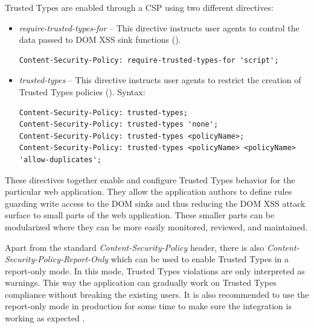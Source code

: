 Trusted Types are enabled through a CSP using two different directives:

\begin{itemize}
  \item \emph{require-trusted-types-for} -- This directive instructs user agents to control the
        data passed to DOM XSS sink functions (\cite{mdn:require-trusted-types-for}).

        \vspace{5mm}
        \bigskip
        \begin{lstlisting}[language={}, caption=Syntax of \emph{require-trusted-types-for directive}]
Content-Security-Policy: require-trusted-types-for 'script';\end{lstlisting}

  \item \emph{trusted-types} -- This directive instructs user agents to restrict the creation of
        Trusted Types policies (\cite{mdn:trusted-types}). Syntax:

        \bigskip
        \begin{lstlisting}[language={}, caption=Syntax of \emph{trusted-types directive}]
Content-Security-Policy: trusted-types;
Content-Security-Policy: trusted-types 'none';
Content-Security-Policy: trusted-types <policyName>;
Content-Security-Policy: trusted-types <policyName> <policyName> 'allow-duplicates';\end{lstlisting}
\end{itemize}

\vspace{5mm}

These directives together enable and configure Trusted Types behavior for the particular web
application. They allow the application authors to define rules guarding write access to the DOM
sinks and thus reducing the DOM XSS attack surface to small parts of the web application. These
smaller parts can be modularized where they can be more easily monitored, reviewed, and maintained.

Apart from the standard \emph{Content-Security-Policy} header, there is also
\emph{Content-Security-Policy-Report-Only} which can be used to enable Trusted Types in a
report-only mode. In this mode, Trusted Types violations are only interpreted as warnings. This way
the application can gradually work on Trusted Types compliance without breaking the existing users.
It is also recommended to use the report-only mode in production for some time to make sure the
integration is working as expected \cite{tt_web_framework_paper}.

